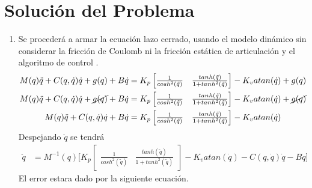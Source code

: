 \documentclass[12pt]{article}
\begin{document}
\section{Solución del Problema}
\begin{enumerate}
    \item Se procederá a armar la ecuación lazo cerrado, usando el modelo dinámico sin considerar la fricción de Coulomb ni la fricción estática de articulación y el algoritmo de control .
    \begin{equation}
        \begin{split}
            M(q)\ddot{q}+C(q,\dot{q})\dot{q}+g(q)+B\dot{q}&=K_p
            \begin{bmatrix}
                \frac{1}{cosh^2(\tilde{q})}&\frac{tanh(\tilde{q})}{1+tanh^2(\tilde{q})}
            \end{bmatrix}
            -K_vatan(\dot{q})+g(q)\\
            M(q)\ddot{q}+C(q,\dot{q})\dot{q}+\cancel{g(q)}+B\dot{q}&=K_p
            \begin{bmatrix}
                \frac{1}{cosh^2(\tilde{q})}&\frac{tanh(\tilde{q})}{1+tanh^2(\tilde{q})}
            \end{bmatrix}
            -K_vatan(\dot{q})+\cancel{g(q)}\\
            M(q)\ddot{q}+C(q,\dot{q})\dot{q}+B\dot{q}&=K_p
            \begin{bmatrix}
                \frac{1}{cosh^2(\tilde{q})}&\frac{tanh(\tilde{q})}{1+tanh^2(\tilde{q})}
            \end{bmatrix}
            -K_vatan(\dot{q})
        \end{split}
        \label{eq:closed_loop}
    \end{equation}
    Despejando $\ddot{q}$ se tendrá
    \begin{equation}
        \begin{split}
            \ddot{q}&=M^{-1}(q)\lbrack K_p
            \begin{bmatrix}
                \frac{1}{cosh^2(\tilde{q})}&\frac{tanh(\tilde{q})}{1+tanh^2(\tilde{q})}
            \end{bmatrix}
            -K_vatan(\dot{q})-C(q,\dot{q})\dot{q}-B\dot{q}\rbrack
        \end{split}
        \label{eq:state}
    \end{equation}
    El error estara dado por la siguiente ecuación.
    \begin{equation}
        \begin{split}

\end{split}
\end{equation}
\end{enumerate}
\end{document}
